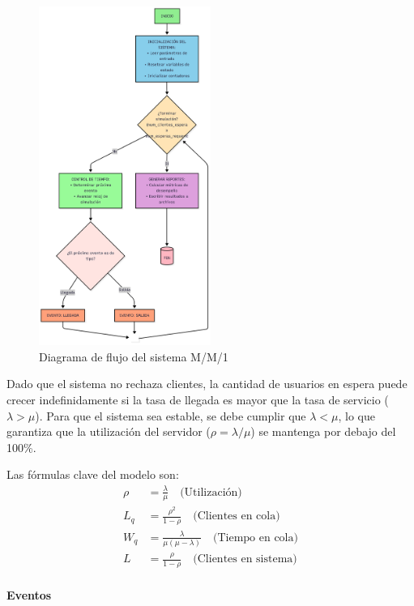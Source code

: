 \documentclass{article}
\begin{document}

\begin{figure}[H]
    \centering
    \includegraphics[width=0.5\textwidth]{images/flujos/MM1FLujo.png}
    \caption{Diagrama de flujo del sistema M/M/1}
    \label{fig:mm1_flujo}
\end{figure}

Dado que el sistema no rechaza clientes, la cantidad de usuarios en espera puede crecer indefinidamente si la tasa de llegada es mayor que la tasa de servicio ($\lambda > \mu$). Para que el sistema sea estable, se debe cumplir que $\lambda < \mu$, lo que garantiza que la utilización del servidor ($\rho = \lambda/\mu$) se mantenga por debajo del 100\%.

Las fórmulas clave del modelo son:
\begin{align}
\rho &= \frac{\lambda}{\mu} \quad \text{(Utilización)} \\
L_q &= \frac{\rho^2}{1-\rho} \quad \text{(Clientes en cola)} \\
W_q &= \frac{\lambda}{\mu(\mu - \lambda)} \quad \text{(Tiempo en cola)} \\
L &= \frac{\rho}{1-\rho} \quad \text{(Clientes en sistema)}
\end{align}

\paragraph{Eventos}
\end{document}
